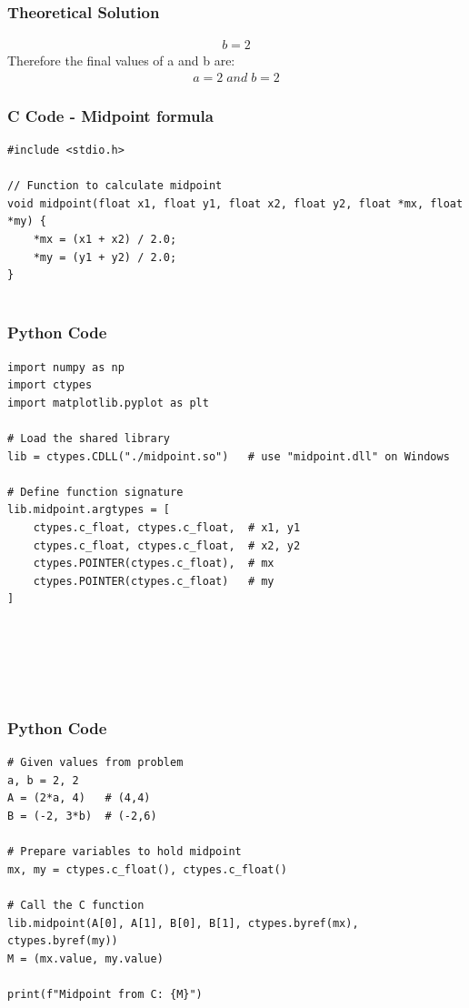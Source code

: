 \documentclass{beamer}
\begin{document}
\begin{frame}
\frametitle{Theoretical Solution}

\begin{align}
b=2
\end{align}
Therefore the final values of a and b are:
\begin{align}
    a=2\;and\;b=2
\end{align}
\end{frame}


\begin{frame}[fragile]
    \frametitle{C Code - Midpoint formula }

    \begin{lstlisting}
#include <stdio.h>

// Function to calculate midpoint
void midpoint(float x1, float y1, float x2, float y2, float *mx, float *my) {
    *mx = (x1 + x2) / 2.0;
    *my = (y1 + y2) / 2.0;
}


    \end{lstlisting}
\end{frame}


\begin{frame}[fragile]
    \frametitle{Python Code}
    \begin{lstlisting}
import numpy as np
import ctypes
import matplotlib.pyplot as plt

# Load the shared library
lib = ctypes.CDLL("./midpoint.so")   # use "midpoint.dll" on Windows

# Define function signature
lib.midpoint.argtypes = [
    ctypes.c_float, ctypes.c_float,  # x1, y1
    ctypes.c_float, ctypes.c_float,  # x2, y2
    ctypes.POINTER(ctypes.c_float),  # mx
    ctypes.POINTER(ctypes.c_float)   # my
]






    \end{lstlisting}
\end{frame}

\begin{frame}[fragile]
    \frametitle{Python Code}
    \begin{lstlisting}
# Given values from problem
a, b = 2, 2
A = (2*a, 4)   # (4,4)
B = (-2, 3*b)  # (-2,6)

# Prepare variables to hold midpoint
mx, my = ctypes.c_float(), ctypes.c_float()

# Call the C function
lib.midpoint(A[0], A[1], B[0], B[1], ctypes.byref(mx), ctypes.byref(my))
M = (mx.value, my.value)

print(f"Midpoint from C: {M}")





    \end{lstlisting}
\end{frame}
\end{document}
